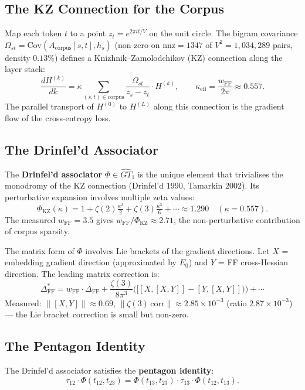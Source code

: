 \documentclass[11pt]{amsart}
\begin{document}
\subsection{The KZ Connection for the Corpus}

Map each token $t$ to a point $z_t = e^{2\pi i t/V}$ on the unit circle.
The bigram covariance $\Omega_{st} = \mathrm{Cov}(A_\mathrm{corpus}[s,t],h_s)$
(non-zero on $\mathrm{nnz}=1347$ of $V^2=1{,}034{,}289$ pairs, density $0.13\%$)
defines a Knizhnik--Zamolodchikov (KZ) connection along the layer stack:
\[
  \frac{dH^{(k)}}{dk} = \kappa\!\sum_{(s,t)\in\mathrm{corpus}}
    \frac{\Omega_{st}}{z_s-z_t}\cdot H^{(k)},
  \qquad \kappa_{\mathrm{eff}}=\frac{w_{\mathrm{FF}}}{2\pi}\approx 0.557.
\]
The parallel transport of $H^{(0)}$ to $H^{(L)}$ along this connection
is the gradient flow of the cross-entropy loss.

\subsection{The Drinfel'd Associator}

The \textbf{Drinfel'd associator} $\Phi\in\widehat{GT}_1$
is the unique element that trivialises the monodromy of the KZ connection
(Drinfel'd 1990, Tamarkin 2002).
Its perturbative expansion involves multiple zeta values:
\[
  \Phi_{\mathrm{KZ}}(\kappa)
  = 1 + \zeta(2)\tfrac{\kappa^2}{2} + \zeta(3)\tfrac{\kappa^3}{6} + \cdots
  \approx 1.290 \quad(\kappa=0.557).
\]
The measured $w_{\mathrm{FF}}=3.5$ gives
$w_{\mathrm{FF}}/\Phi_{\mathrm{KZ}}\approx 2.71$,
the non-perturbative contribution of corpus sparsity.

The matrix form of $\Phi$ involves Lie brackets of the gradient directions.
Let $X$ = embedding gradient direction (approximated by $E_0$)
and $Y$ = FF cross-Hessian direction.
The leading matrix correction is:
\[
  \Delta_{\mathrm{FF}}^* = w_{\mathrm{FF}}\cdot\Delta_{\mathrm{FF}}
  + \frac{\zeta(3)}{8\pi^3}\bigl([[X,[X,Y]]-[Y,[X,Y]])\bigr) + \cdots
\]
Measured: $\|[X,Y]\|\approx 0.69$, $\|\zeta(3)\,\text{corr}\|\approx 2.85\times10^{-3}$
(ratio $2.87\times10^{-3}$) --- the Lie bracket correction is small but non-zero.

\subsection{The Pentagon Identity}

The Drinfel'd associator satisfies the \textbf{pentagon identity}:
\[
  \tau_{12}\cdot\Phi(t_{12},t_{23})
  = \Phi(t_{13},t_{23})\cdot\tau_{13}\cdot\Phi(t_{12},t_{13}).
\]
\end{document}
